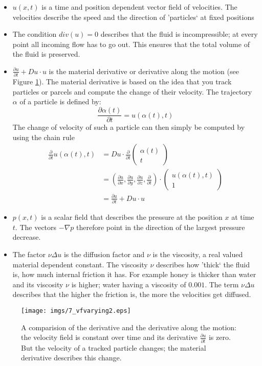 \begin{itemize}
	\item $u(x,t)$ is a time and position dependent vector field of velocities. The velocities describe the speed and the direction of 'particles` at fixed positions
	\item The condition $div(u) = 0$ describes that the fluid is incompressible; at every point all incoming flow has to go out. This ensures that the total volume of the fluid is preserved.
	\item $\frac{\partial u}{\partial t} + D u \cdot u$ is the material derivative or derivative along the motion (see Figure \ref{fig:fsmaterialderivative}). The material derivative is based on the idea that you track particles or parcels and compute the change of their velocity. The trajectory $\alpha$ of a particle is defined by:
\[\frac{\partial \alpha(t)}{\partial t} = u(\alpha(t), t)\]
The change of velocity of such a particle can then simply be computed by using the chain rule  
\begin{align*}\frac{\partial}{\partial t} u(\alpha(t),t) &= Du \cdot \frac{\partial}{\partial t}\begin{pmatrix}
\alpha(t) \\
t
\end{pmatrix}\\
&= (\frac{\partial u}{\partial x}, \frac{\partial u}{\partial y},\frac{\partial u}{\partial z}, \frac{\partial }{\partial t}) \cdot \begin{pmatrix}
u(\alpha(t),t) \\
1
\end{pmatrix} \\
&= \frac{\partial u}{\partial t} + Du \cdot u
\end{align*}
\item $p(x,t)$ is a scalar field that describes the pressure at the position $x$ at time $t$. The vectors $-\nabla p$ therefore point in the direction of the largest pressure decrease.
\item The factor $\nu \Delta u$ is the diffusion factor and $\nu$ is the viscosity, a real valued material dependent constant. The viscosity $\nu$ describes how 'thick` the fluid is, how much internal friction it has. For example honey is thicker than water and its viscosity $\nu$ is higher; water having a viscosity of $0.001$. The term $\nu \Delta u$ describes that the higher the friction is, the more the velocities get diffused.
\end{itemize}

\begin{figure}%
\begin{center}
\texttt{[image: imgs/7\_vfvarying2.eps]}%
\end{center}
\caption{A comparision of the derivative and the derivative along the motion: the velocity field is constant over time and its derivative $\frac{\partial u}{\partial t}$ is zero. But the velocity of a tracked particle changes; the material derivative describes this change.}%
\label{fig:fsmaterialderivative}%
\end{figure}

